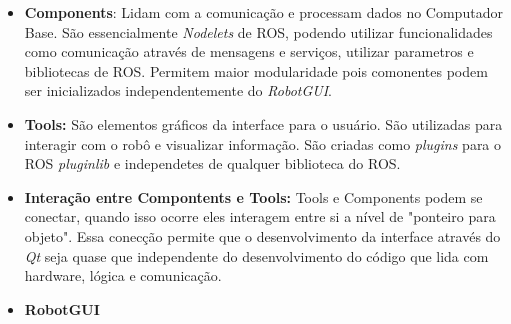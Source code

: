 \begin{itemize}
\item \textbf{Components}: Lidam com a comunicação e processam dados no Computador Base. São essencialmente \textit{Nodelets} de ROS, podendo utilizar funcionalidades como comunicação através de mensagens e serviços, utilizar parametros e bibliotecas de ROS. Permitem maior modularidade pois comonentes podem ser inicializados independentemente do \textit{RobotGUI}.

\item \textbf{Tools:} São elementos gráficos da interface para o usuário. São utilizadas para interagir com o robô e visualizar informação. São criadas como \textit{plugins} para o ROS \textit{pluginlib} e independetes de qualquer biblioteca do ROS.

\item \textbf{Interação entre Compontents e Tools:} Tools e Components podem se conectar, quando isso ocorre eles interagem entre si a nível de "ponteiro para objeto". Essa conecção permite que o desenvolvimento da interface através do \textit{Qt} seja quase que independente do desenvolvimento do código que lida com hardware, lógica e comunicação.

\item \textbf{RobotGUI}
\end{itemize}


